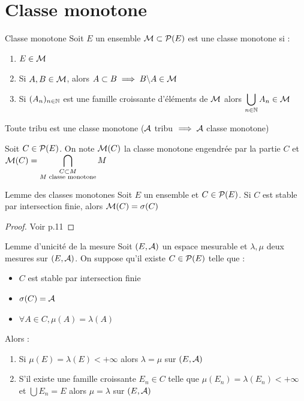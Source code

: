 \documentclass[]{report}
\begin{document}
\section{Classe monotone}

\begin{df}{Classe monotone}{}
    Soit $E$ un ensemble $\mathcal{M}\subset \mathcal{P}(E)$ est une classe monotone si :
    \begin{enumerate}
        \item $E\in\mathcal{M}$
        \item Si $A,B\in\mathcal{M}$, alors $A\subset B\implies B\backslash A\in\mathcal{M}$
        \item Si $(A_n)_{{n\in\mathbb{N}}}$ est une famille croissante d'éléments de $\mathcal{M}$ alors $\displaystyle{\bigcup_{{n\in\mathbb{N}}}A_n\in\mathcal{M}}$
    \end{enumerate}
\end{df}

\begin{prop}{}{}
    Toute tribu est une classe monotone ($\mathcal{A}$ tribu $\implies \mathcal{A}$ classe monotone)
\end{prop}

\begin{df}{}{}
    Soit $C\in\mathcal{P}(E)$. On note $\mathcal{M}(C)$ la classe monotone engendrée par la partie $C$ et $\displaystyle{\mathcal{M}(C)=\bigcap_{\substack{C\subset M\\ M\text{ classe monotone}}}M}$
\end{df}

\begin{lm}{Lemme des classes monotones}{}
    Soit $E$ un ensemble et $C\in\mathcal{P}(E)$.
    Si $C$ est stable par intersection finie, alors $\mathcal{M}(C)=\sigma(C)$
\end{lm}

\begin{proof}{}{}
    Voir p.11
\end{proof}

\begin{lm}{Lemme d'unicité de la mesure}{}
    Soit $(E,\mathcal{A})$ un espace mesurable et $\lambda,\mu$ deux mesures sur $(E,\mathcal{A})$. On suppose qu'il existe $C\in\mathcal{P}(E)$ telle que :
    \begin{itemize}
        \item $C$ est stable par intersection finie
        \item $\sigma(C)=\mathcal{A}$
        \item $\forall A\in C,\mu(A)=\lambda(A)$
    \end{itemize}
    Alors :
    \begin{enumerate}
        \item Si $\mu(E)=\lambda(E)<+\infty$ alors $\lambda=\mu$ sur $(E,\mathcal{A})$
        \item S'il existe une famille croissante $E_n\in C$ telle que $\mu(E_n)=\lambda(E_n)<+\infty$ et $\bigcup E_n=E$ alors $\mu=\lambda$ sur $(E,\mathcal{A})$
    \end{enumerate}
\end{lm}
\end{document}
